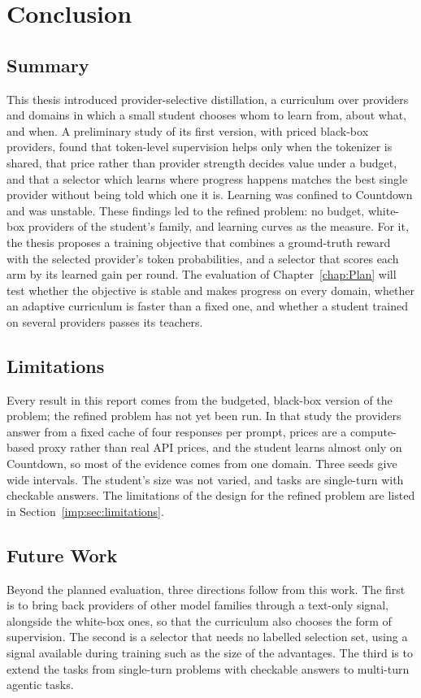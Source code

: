 \chapter{Conclusion}
\label{chap:Conclusion}

\section{Summary}
\label{sec:Summary}

This thesis introduced provider-selective distillation, a curriculum over providers and
domains in which a small student chooses whom to learn from, about what, and when. A
preliminary study of its first version, with priced black-box providers, found that
token-level supervision helps only when the tokenizer is shared, that price rather than
provider strength decides value under a budget, and that a selector which learns where
progress happens matches the best single provider without being told which one it is.
Learning was confined to Countdown and was unstable. These findings led to the refined
problem: no budget, white-box providers of the student's family, and learning curves as
the measure. For it, the thesis proposes a training objective that combines a
ground-truth reward with the selected provider's token probabilities, and a selector
that scores each arm by its learned gain per round. The evaluation of
Chapter~\ref{chap:Plan} will test whether the objective is stable and makes progress on
every domain, whether an adaptive curriculum is faster than a fixed one, and whether a
student trained on several providers passes its teachers.

\section{Limitations}
\label{sec:Limitations}

Every result in this report comes from the budgeted, black-box version of the problem;
the refined problem has not yet been run. In that study the providers answer from a
fixed cache of four responses per prompt, prices are a compute-based proxy rather than
real API prices, and the student learns almost only on Countdown, so most of the
evidence comes from one domain. Three seeds give wide intervals. The student's size was
not varied, and tasks are single-turn with checkable answers. The limitations of the
design for the refined problem are listed in Section~\ref{imp:sec:limitations}.

\section{Future Work}
\label{sec:Future Work}

Beyond the planned evaluation, three directions follow from this work. The first is to
bring back providers of other model families through a text-only signal, alongside the
white-box ones, so that the curriculum also chooses the form of supervision. The second
is a selector that needs no labelled selection set, using a signal available during
training such as the size of the advantages. The third is to extend the tasks from
single-turn problems with checkable answers to multi-turn agentic tasks.
